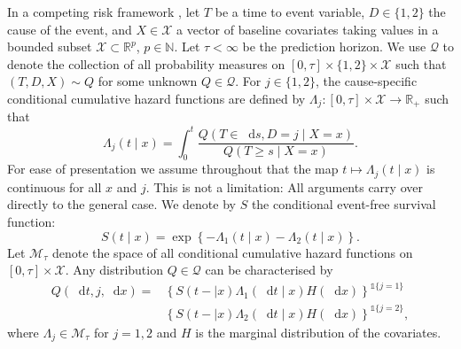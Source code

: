 \documentclass[numsec,webpdf,contemporary,medium,namedate]{oup-authoring-template}%
\theoremstyle{thmstyleone}%
\theoremstyle{thmstyletwo}%
\theoremstyle{thmstylethree}%
\newcommand{\R}{\mathbb{R}}
\newcommand{\N}{\mathbb{N}}
\newcommand*\diff{\mathop{}\!\mathrm{d}}
\newcommand{\1}{\mathds{1}}
\begin{document}
In a competing risk framework \citep{andersen2012statistical}, let
\( T\) be a time to event variable, \(D\in\{1,2\}\) the cause of the
event, and $X \in \mathcal{X}$ a vector of baseline covariates taking
values in a bounded subset \( \mathcal{X} \subset \R^p \),
\( p\in\N \). Let $\tau< \infty$ be the prediction horizon. We use
\( \mathcal{Q} \) to denote the collection of all probability measures
on \( [0,\tau] \times \{1,2\}\times \mathcal{X} \) such that
\( (T, D, X) \sim Q \) for some unknown \( Q \in \mathcal{Q} \). For
\(j\in\{1,2\}\), the cause-specific conditional cumulative hazard
functions are defined by
\( \Lambda_{j} \colon [0, \tau] \times \mathcal{X} \rightarrow \R_+ \)
such that
\begin{equation*}
  \Lambda_{j}(t \mid x) = \int_0^t\frac{  Q(T \in \diff s, D=j \mid X=x )}{Q(T \geq s \mid X=x )}.
\end{equation*}
For ease of presentation we assume throughout that the map
\( t\mapsto \Lambda_j(t \mid x) \) is continuous for all \( x \) and
\( j \). This is not a limitation: All arguments carry over directly
to the general case. We denote by \(S\) the conditional event-free
survival function:
\begin{equation}
  \label{eq:surv-def}
  S(t \mid x)=\exp\left\{-\Lambda_{1}(t \mid x)-\Lambda_{2}(t \mid x)\right\}.
\end{equation}
Let \( \mathcal{M}_{\tau}\) denote the space of all conditional cumulative hazard
functions on \( [0,\tau] \times\mathcal{X}\). Any distribution
\( Q \in \mathcal{Q} \) can be characterised by
\begin{equation*}
  \label{eq:parametrizeQ}
  \begin{split}
    Q(\diff t,j,\diff x)=& \left\{S(t- \mid x)\Lambda_1(\diff t \mid x)H(\diff x)\right\}^{\1{\{j=1\}}}\\
                         &  \left\{S(t- \mid x)\Lambda_2(\diff t \mid x)H(\diff x)\right\}^{\1{\{j=2\}}},
  \end{split}
\end{equation*}
where \(\Lambda_{j} \in \mathcal{M}_{\tau}\) for \(j=1,2\) and \(H\) is the marginal
distribution of the covariates.
\end{document}
